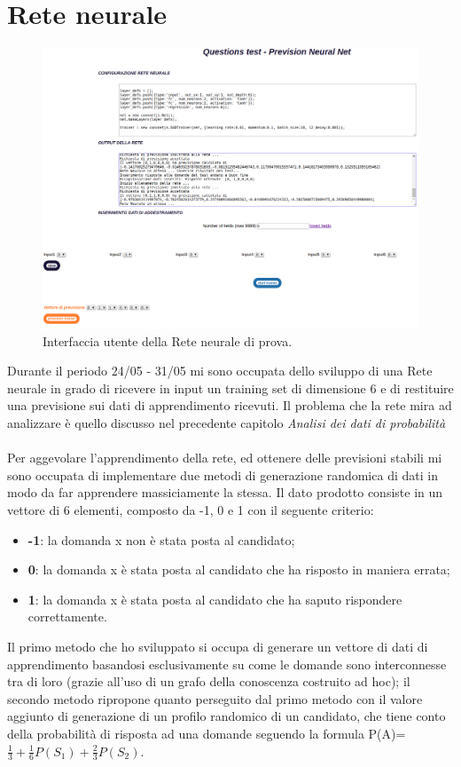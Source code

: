 \section{Rete neurale}
\label{Rete neurale}


\begin{figure}[H]
\centering
	\includegraphics[width=1\linewidth]{./image/GUI-rete-neurale.png}
	\caption{Interfaccia utente della Rete neurale di prova.}
\end{figure}
\noindent
Durante il periodo 24/05 - 31/05 mi sono occupata dello sviluppo di una Rete neurale in grado di ricevere in input un training set di dimensione 6 e di restituire una previsione sui dati di apprendimento ricevuti.
\noindent
Il problema che la rete mira ad analizzare \`e quello discusso nel precedente capitolo \textit{Analisi dei dati di probabilit\`a}
\\\\
Per aggevolare l'apprendimento della rete, ed ottenere delle previsioni stabili mi sono occupata di implementare due metodi di generazione randomica di dati in modo da far apprendere massiciamente la stessa.
Il dato prodotto consiste in un vettore di 6 elementi, composto da  -1, 0 e 1 con il seguente criterio:
\begin{itemize}
\item \textbf{-1}: la domanda x non \`e stata posta al candidato;
\item \textbf{0}: la domanda x \`e stata posta al candidato che ha risposto in maniera errata;
\item \textbf{1}: la domanda x \`e stata posta al candidato che ha saputo rispondere correttamente.
\end{itemize}
\noindent
Il primo metodo che ho sviluppato si occupa di generare un vettore di dati di apprendimento basandosi esclusivamente su come le domande sono interconnesse tra di loro (grazie all'uso di un grafo della conoscenza costruito ad hoc); il secondo metodo ripropone quanto perseguito dal primo metodo con il valore aggiunto di generazione di un profilo randomico di un candidato, che tiene conto della  probabilit\`a di risposta ad una domande seguendo la formula P(A)= $\frac{1}{3}+\frac{1}{6}P(S_1)+\frac{2}{3}P(S_2)$.

